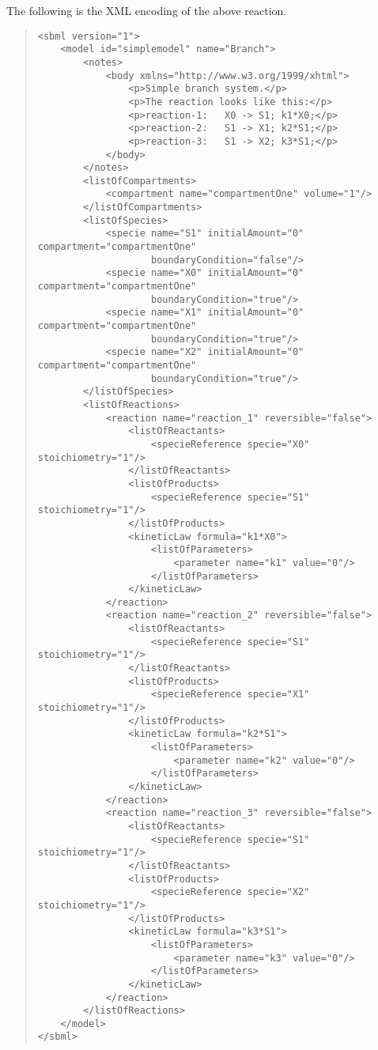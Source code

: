 \documentclass[10pt]{cek-article}
\begin{document}
The following is the XML encoding of the above reaction.
\begin{quote}
\begin{small}
\tightspacing
\begin{verbatim}
<sbml version="1">
    <model id="simplemodel" name="Branch">
        <notes>
            <body xmlns="http://www.w3.org/1999/xhtml">
                <p>Simple branch system.</p>
                <p>The reaction looks like this:</p>
                <p>reaction-1:   X0 -> S1; k1*X0;</p>
                <p>reaction-2:   S1 -> X1; k2*S1;</p>
                <p>reaction-3:   S1 -> X2; k3*S1;</p>
            </body>
        </notes>
        <listOfCompartments>
            <compartment name="compartmentOne" volume="1"/>
        </listOfCompartments>
        <listOfSpecies>
            <specie name="S1" initialAmount="0" compartment="compartmentOne"
                    boundaryCondition="false"/>
            <specie name="X0" initialAmount="0" compartment="compartmentOne"
                    boundaryCondition="true"/>
            <specie name="X1" initialAmount="0" compartment="compartmentOne"
                    boundaryCondition="true"/>
            <specie name="X2" initialAmount="0" compartment="compartmentOne"
                    boundaryCondition="true"/>
        </listOfSpecies>
        <listOfReactions>
            <reaction name="reaction_1" reversible="false">
                <listOfReactants>
                    <specieReference specie="X0" stoichiometry="1"/>
                </listOfReactants>
                <listOfProducts>
                    <specieReference specie="S1" stoichiometry="1"/>
                </listOfProducts>
                <kineticLaw formula="k1*X0">
                    <listOfParameters>
                        <parameter name="k1" value="0"/>
                    </listOfParameters>
                </kineticLaw>
            </reaction>
            <reaction name="reaction_2" reversible="false">
                <listOfReactants>
                    <specieReference specie="S1" stoichiometry="1"/>
                </listOfReactants>
                <listOfProducts>
                    <specieReference specie="X1" stoichiometry="1"/>
                </listOfProducts>
                <kineticLaw formula="k2*S1">
                    <listOfParameters>
                        <parameter name="k2" value="0"/>
                    </listOfParameters>
                </kineticLaw>
            </reaction>
            <reaction name="reaction_3" reversible="false">
                <listOfReactants>
                    <specieReference specie="S1" stoichiometry="1"/>
                </listOfReactants>
                <listOfProducts>
                    <specieReference specie="X2" stoichiometry="1"/>
                </listOfProducts>
                <kineticLaw formula="k3*S1">
                    <listOfParameters>
                        <parameter name="k3" value="0"/>
                    </listOfParameters>
                </kineticLaw>
            </reaction>
        </listOfReactions>
    </model>
</sbml>

\end{verbatim}
  \regularspacing
\end{small}
\end{quote}
\end{document}
